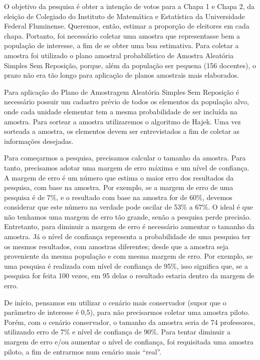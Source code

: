 \documentclass[12pt,a4paper]{article}
\title{}
\author{}
\date{}
\begin{document}

O objetivo da pesquisa é obter a intenção de votos para a Chapa 1 e
Chapa 2, da eleição de Colegiado do Instituto de Matemática e
Estatística da Universidade Federal Fluminense. Queremos, então, estimar
a proporção de eleitores em cada chapa. Portanto, foi necessário coletar
uma amostra que representasse bem a população de interesse, a fim de se
obter uma boa estimativa. Para coletar a amostra foi utilizado o plano
amostral probabilístico de Amostra Aleatória Simples Sem Reposição,
porque, além da população ser pequena (156 docentes), o prazo não era
tão longo para aplicação de planos amostrais mais elaborados.

Para aplicação do Plano de Amostragem Aleatória Simples Sem Reposição é
necessário possuir um cadastro prévio de todos os elementos da população
alvo, onde cada unidade elementar tem a mesma probabilidade de ser
incluída na amostra. Para sortear a amostra utilizaremos o algoritmo de
Hajek. Uma vez sorteada a amostra, os elementos devem ser entrevistados
a fim de coletar as informações desejadas.

Para começarmos a pesquisa, precisamos calcular o tamanho da amostra.
Para tanto, precisamos adotar uma margem de erro máxima e um nível de
confiança. A margem de erro é um número que estima o maior erro dos
resultados da pesquisa, com base na amostra. Por exemplo, se a margem de
erro de uma pesquisa é de 7\%, e o resultado com base na amostra for de
60\%, devemos considerar que este número na verdade pode oscilar de 53\%
a 67\%. O ideal é que não tenhamos uma margem de erro tão grande, senão
a pesquisa perde precisão. Entretanto, para diminuir a margem de erro é
necessário aumentar o tamanho da amostra. Já o nível de confiança
representa a probabilidade de uma pesquisa ter os mesmos resultados, com
amostras diferentes; desde que a amostra seja proveniente da mesma
população e com mesma margem de erro. Por exemplo, se uma pesquisa é
realizada com nível de confiança de 95\%, isso significa que, se a
pesquisa for feita 100 vezes, em 95 delas o resultado estaria dentro da
margem de erro.

De início, pensamos em utilizar o cenário mais conservador (supor que o
parâmetro de interesse é 0,5), para não precisarmos coletar uma amostra
piloto. Porém, com o cenário conservador, o tamanho da amostra seria de
74 professores, utilizando erro de 7\% e nível de confiança de 90\%.
Para tentar diminuir a margem de erro e/ou aumentar o nível de
confiança, foi requisitada uma amostra piloto, a fim de entrarmos num
cenário mais ``real''.
\end{document}
